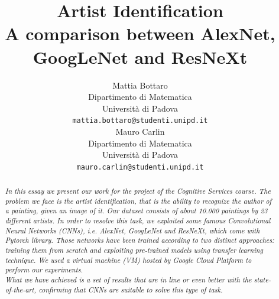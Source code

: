 \documentclass{article}
\title{Artist Identification	\\  A comparison between AlexNet, GoogLeNet and ResNeXt}
\author{
  Mattia Bottaro \\
  Dipartimento  di Matematica\\
  Università di Padova \\
  \texttt{mattia.bottaro@studenti.unipd.it} \\
   \And
  Mauro Carlin \\
Dipartimento  di Matematica\\
Università di Padova \\
\texttt{mauro.carlin@studenti.unipd.it} \\
}
\begin{document}
\maketitle

\begin{abstract}
	\textit{In this essay we present our work for the project of the Cognitive Services course.
	The problem we face is the artist identification, that is the ability to recognize the author of a painting, given an image of it. Our dataset consists of about 10.000 paintings by 23 different artists.
	In order to resolve this task, we exploited some famous Convolutional Neural Networks (CNNs), i.e. AlexNet, GoogLeNet and ResNeXt, which come with \textit{Pytorch} library. Those networks have been trained according to two distinct approaches: training them from scratch and exploiting pre-trained models using transfer learning technique. We used a virtual machine (VM) hosted by \textit{Google Cloud Platform} to perform our experiments.\\
	What we have achieved is a set of results that are in line or even better with the state-of-the-art, confirming that CNNs are suitable to solve this type of task.}
\end{abstract}


\end{document}
